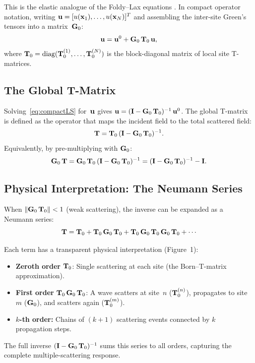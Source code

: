 This is the elastic analogue of the Foldy--Lax
equations \citep{Foldy1945,Lax1952}.  In compact operator notation, writing
$\mathbf{u} = [u(\mathbf{x}_1),\ldots,u(\mathbf{x}_N)]^T$ and assembling the inter-site
Green's tensors into a matrix~$\mathbf{G}_0$:
\begin{equation}
  \mathbf{u} = \mathbf{u}^0 + \mathbf{G}_0\,\mathbf{T}_0\,\mathbf{u},
\label{eq:compactLS}
\end{equation}
where $\mathbf{T}_0 = \mathrm{diag}(\mathbf{T}_0^{(1)},\ldots,\mathbf{T}_0^{(N)})$ is the
block-diagonal matrix of local site T-matrices.

\subsection{The Global T-Matrix}

Solving~\eqref{eq:compactLS} for~$\mathbf{u}$ gives
$\mathbf{u} = (\mathbf{I} - \mathbf{G}_0\,\mathbf{T}_0)^{-1}\,\mathbf{u}^0$.  The global T-matrix is
defined as the operator that maps the incident field to the total scattered
field:
\begin{equation}
  \mathbf{T} = \mathbf{T}_0\,(\mathbf{I} - \mathbf{G}_0\,\mathbf{T}_0)^{-1}.
\label{eq:Tglobal}
\end{equation}
Equivalently, by pre-multiplying with $\mathbf{G}_0$:
\begin{equation}
  \mathbf{G}_0\,\mathbf{T}
  = \mathbf{G}_0\,\mathbf{T}_0\,(\mathbf{I} - \mathbf{G}_0\,\mathbf{T}_0)^{-1}
  = (\mathbf{I} - \mathbf{G}_0\,\mathbf{T}_0)^{-1} - \mathbf{I}.
\label{eq:G0T}
\end{equation}

\subsection{Physical Interpretation: The Neumann Series}

When $\|\mathbf{G}_0\,\mathbf{T}_0\| < 1$ (weak scattering), the inverse can be
expanded as a Neumann series:
\begin{equation}
  \bT = \bT_0 + \bT_0\,\bG_0\,\bT_0
  + \bT_0\,\bG_0\,\bT_0\,\bG_0\,\bT_0 + \cdots
\label{eq:Neumann}
\end{equation}

Each term has a transparent physical interpretation (Figure~1):

\begin{itemize}
\item \textbf{Zeroth order} $\mathbf{T}_0$: Single scattering at each site (the
  Born--T-matrix approximation).

\item \textbf{First order} $\mathbf{T}_0\,\mathbf{G}_0\,\mathbf{T}_0$: A wave scatters at
  site~$n$ ($\mathbf{T}_0^{(n)}$), propagates to site~$m$ ($\mathbf{G}_0$), and scatters
  again ($\mathbf{T}_0^{(m)}$).

\item \textbf{$k$-th order:}  Chains of $(k+1)$ scattering events
  connected by $k$ propagation steps.
\end{itemize}
The full inverse $(\mathbf{I} - \mathbf{G}_0\,\mathbf{T}_0)^{-1}$ sums this series to all
orders, capturing the complete multiple-scattering response.

